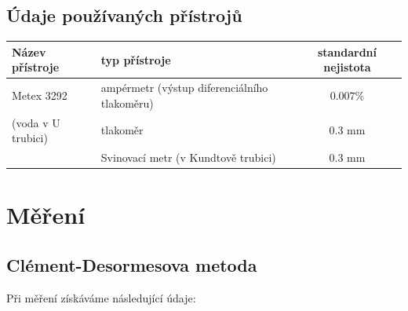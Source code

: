 \documentclass[czech,11pt,a4paper]{article}
\begin{document}
		\subsection{Údaje používaných přístrojů}
		\begin{center}
			\begin{tabular}{|l|l|c|}
				\hline
				Název přístroje & typ přístroje           & standardní nejistota   \\ \hline \hline
				Metex 3292      & ampérmetr  (výstup diferenciálního tlakoměru)   &   $0.007\%$     \\ \hline
			    (voda v U trubici)  & tlakoměr               & $ 0.3 $ mm \\ \hline
				  & Svinovací metr (v Kundtově trubici)   &$ 0.3 $ mm\\ \hline
			\end{tabular}
		\end{center}
	
	\newpage
	\section{Měření}
	\subsection{Clément-Desormesova metoda}
	Při měření získáváme následující údaje:
	
\end{document}
